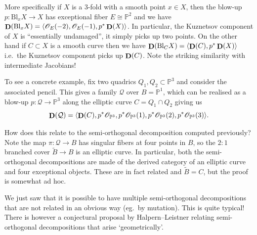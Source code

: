 More specifically if \(X\) is a 3-fold with a smooth point \(x\in X\), then the
blow-up \(p:\text{Bl}_xX\to X\) has exceptional fiber \(E\cong \mathbb{P}^2\)
and we have \(\mathop{\mathbf{D}}(\text{Bl}_xX)= \langle \mathscr{O}_E(-2), \mathscr{O}_E(-1),
p^\ast \mathop{\mathbf{D}}(X)\rangle\). In particular, the Kuznetsov component of \(X\)  is
``essentially undamaged'', it simply picks up two points. On the other hand if
\(C\subset X\) is a smooth curve then we have \(\mathop{\mathbf{D}}(\text{Bl}_CX)=\langle
\mathop{\mathbf{D}}(C), p^\ast \mathop{\mathbf{D}}(X) \rangle\) i.e.\ the Kuznetsov component  picks up
\(\mathop{\mathbf{D}}(C)\). Note the striking similarity with intermediate Jacobians!

To see a concrete example, fix two quadrics \(Q_1,Q_2\subset \mathbb{P}^3\) and
consider the associated pencil. This gives a family \(\mathcal{Q}\) over
\(B=\mathbb{P}^1\), which can be realised as a blow-up \(p:\mathcal{Q} \to
\mathbb{P}^3\) along the elliptic curve \(C=Q_1\cap Q_2\) giving us
\[
    \mathop{\mathbf{D}}(\mathcal{Q})=\langle \mathop{\mathbf{D}}(C), p^\ast \mathscr{O}_{\mathbb{P}^3},
    p^\ast \mathscr{O}_{\mathbb{P}^3}(1), p^\ast
    \mathscr{O}_{\mathbb{P}^3}(2),p^\ast \mathscr{O}_{\mathbb{P}^3}(3)  \rangle.
\]

How does this relate to the semi-orthogonal decomposition computed previously?
Note the map \(\pi:\mathcal{Q}\to B\) has singular fibers at four points in
\(B\), so the \(2:1\) branched cover \(\tilde B\to B\) is an elliptic curve.
In particular, both the semi-orthogonal decompositions are made of the derived
category of an elliptic curve and four exceptional objects. These are in fact
related and \(\tilde B = C\), but the proof is somewhat ad hoc.

\begin{remark}
    We just saw that it is possible to have multiple semi-orthogonal
    decompositions that are not related in an obvious way (eg.\ by mutation).
    This is quite typical! There is however a conjectural proposal by
    Halpern--Leistner relating semi-orthogonal decompositions that arise
    `geometrically'.
\end{remark}

